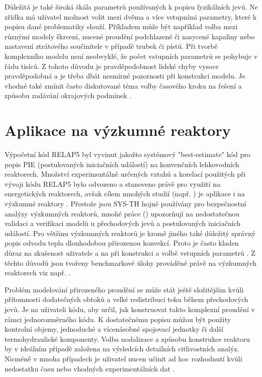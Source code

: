 Důležitá je také široká škála parametrů používaných k popisu fyzikálních jevů. Ne zřídka má uživatel možnost volit mezi dvěma a více vstupními parametry, které k popisu dané problematiky slouží. Příkladem může být například volba mezi různými modely škrcení, nucené proudění podchlazené či nasycené kapaliny nebo nastavení ztrátového součinitele v případě trubek či pístů. Při tvorbě komplexního modelu není neobvyklé, že počet vstupních parametrů se pohybuje v řádu tisíců. Z tohoto důvodu je pravděpodobnost lidské chyby vysoce pravděpodobná a je třeba dbát nesmírné pozornosti při konstrukci modelu. Je vhodné také zmínit často diskutované téma volby časového kroku na řešení a způsobu zadávání okrajových podmínek \cite{petruzzi2008thermal}.

\section{Aplikace na výzkumné reaktory}
Výpočetní kód RELAP5 byl vyvinut jakožto systémový "best-estimate" kód pro popis PIE (postulovaných iniciačních událostí) na konvenčních lehkovodních reaktorech. Množství experimentálně určených vztahů a korelací použitých při vývoji kódu RELAP5 bylo odvozeno a stanoveno právě pro využití na energetických reaktorech, avšak cílem mnohých studií (např. \cite{REIS2012300, CHATZIDAKIS2013341, AZZOUNE2010823}) je aplikace i na výzkumné reaktory \cite{HEDAYAT2017953}. Přestože jsou SYS-TH hojně používány pro bezpečnostní analýzy výzkumných reaktorů, mnohé práce (\cite{international1992iaea, OMAR2010572, CHATZIDAKIS_ASSESMENT_RSG}) upozorňují na nedostatečnou validaci a verifikaci modelů u přechodových jevů a postulovaných iniciačních událostí.  Pro většinu výzkumných reaktorů je kromě jiného také důležitý správný popis odvodu tepla dlouhodobou přirozenou konvekcí. Proto je často kladen důraz na zkušenost uživatele a na  při konstrukci a volbě vstupních parametrů \cite{bestion2017structure}. Z těchto důvodů jsou tvořeny benchmarkové úlohy prováděné právě na výzkumných reaktorech viz např. \cite{international2022iaea_benchmark_database}.

Problém modelování přirozeného proudění se může stát ještě složitějším kvůli přítomnosti dodatečných obtoků a velké redistribuci toku během přechodových jevů. Je na uživateli kódu, aby určil, jak konstruovat takto komplexní proudění v rámci jednorozměrného kódu. K dostatečnému popisu můžou být použity kontrolní objemy, jednoduché a vícenásobné spojovací jednotky či další termohydraulické komponenty. Volba nodalizace a způsobu konstrukce reaktoru by v ideálním případě založena na výsledcích detailních citlivostních analýz. Nicméně v mnoha případech je uživatel nucen učinit ad hoc rozhodnutí kvůli nedostatku času nebo vhodných experimentálních dat \cite{petruzzi2008thermal}.




